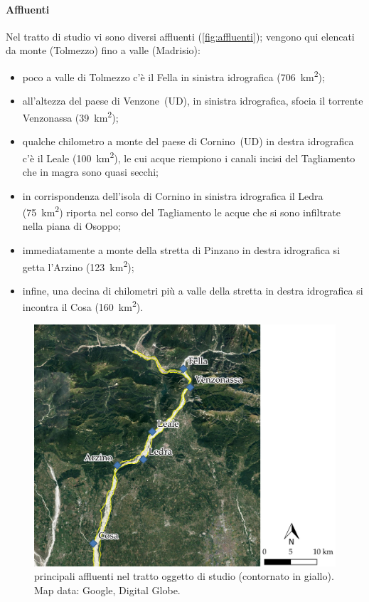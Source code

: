 \paragraph{Affluenti}
Nel tratto di studio vi sono diversi affluenti (\vref{fig:affluenti}); vengono qui elencati da monte (Tolmezzo) fino a valle (Madrisio):
%
\begin{itemize}
	\item poco a valle di Tolmezzo c'è il Fella in sinistra idrografica (\SI{706}{\kilo\m\tothe{2}});
	\item all'altezza del paese di Venzone~(UD), in sinistra idrografica, sfocia il torrente Venzonassa (\SI{39}{\kilo\m\tothe{2}});
	\item qualche chilometro a monte del paese di Cornino~(UD) in destra idrografica c'è il Leale (\SI{100}{\kilo\m\tothe{2}}), le cui acque riempiono i canali incisi del Tagliamento che in magra sono quasi secchi;
	\item in corrispondenza dell'isola di Cornino in sinistra idrografica il Ledra (\SI{75}{\kilo\m\tothe{2}}) riporta nel corso del Tagliamento le acque che si sono infiltrate nella piana di Osoppo;
	\item immediatamente a monte della stretta di Pinzano in destra idrografica si getta l'Arzino (\SI{123}{\kilo\m\tothe{2}});
	\item infine, una decina di chilometri più a valle della stretta in destra idrografica si incontra il Cosa (\SI{160}{\kilo\m\tothe{2}}).
\end{itemize}
%
\begin{figure}
	\centering
	\includegraphics[width=\textwidth]{files/overview_affluenti.jpeg}
	\caption[principali affluenti nel tratto oggetto di studio]{principali affluenti nel tratto oggetto di studio (contornato in giallo).
	\\
	Map data: Google, Digital Globe.}
	\label{fig:affluenti}
\end{figure}
